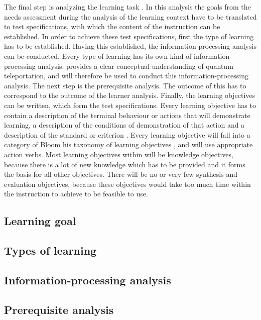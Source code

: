 \documentclass[11pt,twoside]{report} %
\begin{document}
The final step is analyzing the learning task \cite{smithragan}. In this analysis the goals from the needs assessment during the analysis of the learning context have to be translated to test specifications, with which the content of the instruction can be established. In order to achieve these test specifications, first the type of learning has to be established. Having this established, the information-processing analysis can be conducted. Every type of learning has its own kind of information-processing analysis.  provides a clear conceptual understanding of quantum teleportation, and will therefore be used to conduct this information-processing analysis. The next step is the prerequisite analysis. The outcome of this has to correspond to the outcome of the learner analysis. Finally, the learning objectives can be written, which form the test specifications. Every learning objective has to contain a description of the terminal behaviour or actions that will demonstrate learning, a description of the conditions of demonstration of that action and a description of the standard or criterion \cite{smithragan}. Every learning objective will fall into a category of Bloom his taxonomy of learning objectives \cite{bloom}, and will use appropriate action verbs. Most learning objectives within will be knowledge objectives, because there is a lot of new knowledge which has to be provided and it forms the basis for all other objectives. There will be no or very few synthesis and evaluation objectives, because these objectives would take too much time within the instruction to achieve to be feasible to use.

\subsection{Learning goal}

\subsection{Types of learning}

\subsection{Information-processing analysis}

\subsection{Prerequisite analysis}
\end{document}
